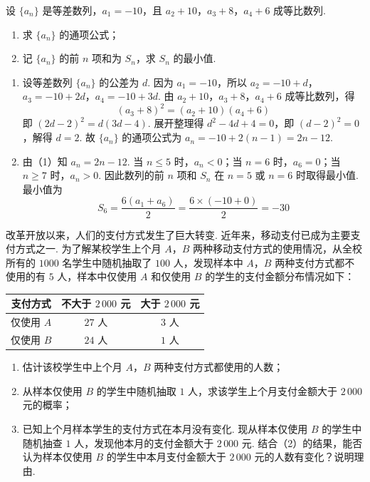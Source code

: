 \begin{problem}
设 \(\{a_n\}\) 是等差数列，\(a_1=-10\)，且 \(a_2+10\)，\(a_3+8\)，\(a_4+6\) 成等比数列.

\begin{enumerate}
\item 求 \(\{a_n\}\) 的通项公式；

\item 记 \(\{a_n\}\) 的前 \(n\) 项和为 \(S_n\)，求 \(S_n\) 的最小值.
\end{enumerate}
\end{problem}

\begin{solution}
\begin{enumerate}
\item 设等差数列 \(\{a_n\}\) 的公差为 \(d\). 因为 \(a_1=-10\)，所以 \(a_2=-10+d\)，\(a_3=-10+2d\)，\(a_4=-10+3d\).
由 \(a_2+10\)，\(a_3+8\)，\(a_4+6\) 成等比数列，得
\[
(a_3+8)^2=(a_2+10)(a_4+6)
\]
即 \((2d-2)^2=d(3d-4)\). 展开整理得 \(d^2-4d+4=0\)，即 \((d-2)^2=0\)，解得 \(d=2\).
故 \(\{a_n\}\) 的通项公式为 \(a_n=-10+2(n-1)=2n-12\).

\item 由（1）知 \(a_n=2n-12\). 当 \(n\le5\) 时，\(a_n<0\)；当 \(n=6\) 时，\(a_6=0\)；当 \(n\ge7\) 时，\(a_n>0\).
因此数列的前 \(n\) 项和 \(S_n\) 在 \(n=5\) 或 \(n=6\) 时取得最小值.
最小值为
\[
S_6=\frac{6(a_1+a_6)}{2}=\frac{6\times(-10+0)}{2}=-30
\]
\end{enumerate}
\end{solution}

\begin{problem}
改革开放以来，人们的支付方式发生了巨大转变. 近年来，移动支付已成为主要支付方式之一. 为了解某校学生上个月 \(A\)，\(B\) 两种移动支付方式的使用情况，从全校所有的 \(1000\) 名学生中随机抽取了 \(100\) 人，发现样本中 \(A\)，\(B\) 两种支付方式都不使用的有 \(5\) 人，样本中仅使用 \(A\) 和仅使用 \(B\) 的学生的支付金额分布情况如下：

\begin{center}
\begin{tabular}{|c|c|c|}
\hline
支付方式 & 不大于 \(2\,000\) 元 & 大于 \(2\,000\) 元 \\
\hline
仅使用 \(A\) & \(27\) 人 & \(3\) 人 \\
\hline
仅使用 \(B\) & \(24\) 人 & \(1\) 人 \\
\hline
\end{tabular}
\end{center}

\begin{enumerate}
\item 估计该校学生中上个月 \(A\)，\(B\) 两种支付方式都使用的人数；

\item 从样本仅使用 \(B\) 的学生中随机抽取 \(1\) 人，求该学生上个月支付金额大于 \(2\,000\) 元的概率；

\item 已知上个月样本学生的支付方式在本月没有变化. 现从样本仅使用 \(B\) 的学生中随机抽查 \(1\) 人，发现他本月的支付金额大于 \(2\,000\) 元. 结合（2）的结果，能否认为样本仅使用 \(B\) 的学生中本月支付金额大于 \(2\,000\) 元的人数有变化？说明理由.
\end{enumerate}
\end{problem}

